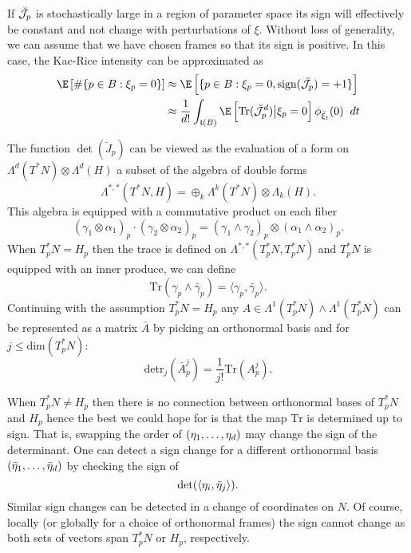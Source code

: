 \documentclass{article}
\newcommand{\randsec}{\xi}
\begin{document}
\begin{eqaution}
If $\breve{\cal J}_p$ is stochastically large in a region of parameter space its
sign will effectively be constant and not change with perturbations
of $\randsec$. Without loss of generality, we can assume that we have chosen frames so that its sign is positive.
In this case, the Kac-Rice intensity can be approximated as
\begin{equation}
  \label{eq:sign:definite}
\begin{aligned}
\E \left[\# \{p \in B: \randsec_p=0\} \right] & \approx \E \left[\{p \in B: \randsec_p=0, \text{sign}(\breve{\cal J}_p)=+1\} \right] \\
& \approx \frac{1}{d!} \int_{\coordchart(B)} \E \left[ \text{Tr}(\breve{\cal J}_p^d) \bigl| \randsec_p=0\right] \phi_{\breve{\randsec}_t}(0) \; \; dt
\end{aligned}
  \end{equation}

The function $\det(\breve{J}_p)$ can be viewed as the evaluation of a form on $\Lambda^d(T^*N) \otimes \Lambda^d(H)$
a subset of the algebra of double forms
$$\Lambda^{*,*}(T^*N, H) = \oplus_{k} \Lambda^{k}(T^*N) \otimes \Lambda_{k}(H).$$
This algebra is equipped with a commutative product on each fiber
$$
(\gamma_1 \otimes \alpha_1)_p \cdot (\gamma_2 \otimes \alpha_2)_p = (\gamma_1 \wedge \gamma_2)_p \otimes (\alpha_1 \wedge \alpha_2)_p.
$$
When $T^*_pN = H_p$ then the trace is defined on $\Lambda^{*,*}(T^*_pN, T^*_pN)$ and $T^*_pN$ is equipped
with an inner produce, we can define
$$
\text{Tr}(\gamma_p \wedge \bar{\gamma}_p) = \langle \gamma_p, \bar{\gamma}_p \rangle.
$$
Continuing with the assumption $T^*_pN=H_p$ any $A \in \Lambda^1(T^*_pN) \wedge \Lambda^1(T^*_pN)$
can be represented as a matrix $\bar{A}$ by picking an orthonormal basis
and for $j \leq \text{dim}(T^*_pN)$:
$$
\text{detr}_j(\bar{A}^j_p) = \frac{1}{j!} \text{Tr}(A^j_p).
$$

When $T_p^*N \neq H_p$ then there is no connection between orthonormal bases
of $T_p^*N$ and $H_p$ hence the best we could hope for is that the
map $\text{Tr}$ is determined up to sign. That is, swapping the order of  $(\eta_1, \dots, \eta_d)$ may change the sign of the determinant. One can detect a sign change for a different orthonormal basis $(\bar{\eta}_1, \dots, \bar{\eta}_d)$ by
checking the sign of
$$
\text{det}(\langle \eta_i, \bar{\eta}_j \rangle).
$$
Similar sign changes can be detected in a change of coordinates on $N$. Of course, locally (or globally for a choice of orthonormal frames) the sign
cannot change as both sets of vectors span $T_p^*N$ or $H_p$, respectively.


\end{eqaution}
\end{document}

